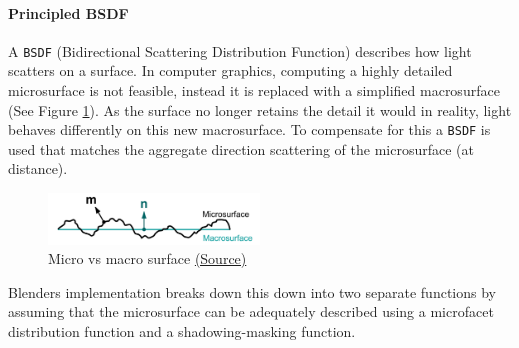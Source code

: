 \documentclass[11pt]{article}
\begin{document}
\paragraph{Principled BSDF}
\label{sec:orgbf01416}
A \texttt{BSDF} (Bidirectional Scattering Distribution Function) describes how light
scatters on a surface. In computer graphics, computing a highly detailed
microsurface is not feasible, instead it is replaced with a simplified
macrosurface (See Figure \ref{micro-vs-macro}). As the surface no longer retains the
detail it would in reality, light behaves differently on this new macrosurface.
To compensate for this a \texttt{BSDF} is used that matches the aggregate direction
scattering of the microsurface (at distance). \cite{ggx-paper}
\begin{figure}[htbp]
\centering
\includegraphics[width=0.5\textwidth]{Images/macro vs micro.png}
\caption{\label{micro-vs-macro}Micro vs macro surface \href{https://www.cs.cornell.edu/\~srm/publications/EGSR07-btdf.pdf}{(Source)}}
\end{figure}

Blenders implementation breaks down this down into two separate functions
by assuming that the microsurface can be adequately described using a microfacet
distribution function and a shadowing-masking function.
\end{document}
